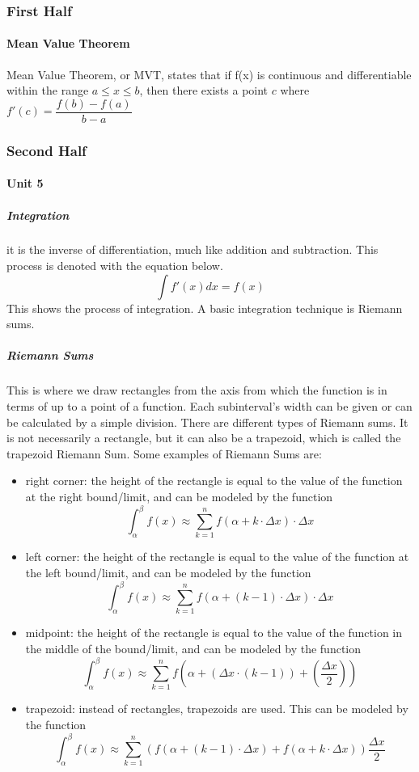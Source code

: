 \documentclass{article} %
\theoremstyle{theorem}
\theoremstyle{definition}
\begin{document}
        \subsubsection{First Half}
            \paragraph{Mean Value Theorem} %
            \label{ssub:Mean Value Theorem}
                Mean Value Theorem, or MVT, states that if f(x) is continuous and differentiable within the range $a\le x \le b$, then there exists a point $c$ where $f'(c) = \dfrac{f(b)-f(a)}{b-a}$
        \subsubsection{Second Half}
            \paragraph{Unit 5}
                \subparagraph{Integration}
                    it is the inverse of differentiation, much like addition and subtraction. This process is denoted with the equation below.
                    $$\int f'(x)dx = f(x)$$
                    This shows the process of integration. A basic integration technique is Riemann sums.
                \subparagraph{Riemann Sums}
                    This is where we draw rectangles from the axis from which the function is in terms of up to a point of a function. Each subinterval's width can be given or can be calculated by a simple division. There are different types of Riemann sums.
                    It is not necessarily a rectangle, but it can also be a trapezoid, which is called the trapezoid Riemann Sum.
                    Some examples of Riemann Sums are:
                    \begin{itemize}
                        \item right corner: the height of the rectangle is equal to the value of the function at the right bound/limit, and can be modeled by the function $$\int_\alpha^\beta f(x)\approx \sum_{k=1}^{n}f(\alpha+k \cdot \Delta x)\cdot\Delta x$$
                        \item left corner: the height of the rectangle is equal to the value of the function at the left bound/limit, and can be modeled by the function $$\int_\alpha^\beta f(x) \approx \sum_{k=1}^{n}f(\alpha+(k-1)\cdot \Delta x)\cdot\Delta x$$
                        \item midpoint: the height of the rectangle is equal to the value of the function in the middle of the bound/limit, and can be modeled by the function $$\int_\alpha^\beta f(x)\approx \sum_{k=1}^{n}f(\alpha+(\Delta x\cdot(k-1))+(\frac{\Delta x}{2}))$$
                    \item trapezoid: instead of rectangles, trapezoids are used. This can be modeled by the function $$\int_\alpha^\beta f(x)\approx \sum_{k=1}^{n}(f(\alpha+(k-1)\cdot\Delta x)+f(\alpha+k\cdot\Delta x))\frac{\Delta x}{2}$$
                    \end{itemize}
\end{document}
